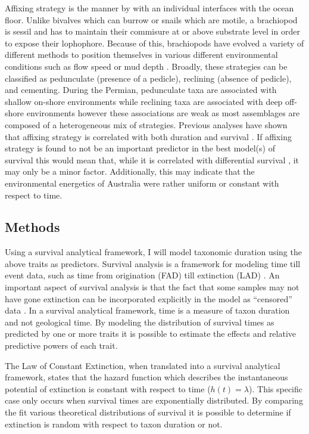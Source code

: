 \documentclass[12pt,letterpaper]{article}
\begin{document}
Affixing strategy is the manner by with an individual interfaces with the ocean floor. Unlike bivalves which can burrow or snails which are motile, a brachiopod is sessil and has to maintain their commisure at or above substrate level in order to expose their lophophore. Because of this, brachiopods have evolved a variety of different methods to position themselves in various different environmental conditions such as flow speed or mud depth \citep{Rudwick1970,Alexander1977,LaBarbera1978,LaBarbera1981,Richardson1997}. Broadly, these strategies can be classified as pedunculate (presence of a pedicle), reclining (absence of pedicle), and cementing. During the Permian, pedunculate taxa are associated with shallow on-shore environments while reclining taxa are associated with deep off-shore environments \citep{Clapham2007} however these associations are weak as most assemblages are composed of a heterogeneous mix of strategies. Previous analyses have shown that affixing strategy is correlated with both duration and survival \citep{Alexander1977,Johansen1989}. If affixing strategy is found to not be an important predictor in the best model(s) of survival this would mean that, while it is correlated with differential survival \citep{Alexander1977,Johansen1989}, it may only be a minor factor. Additionally, this may indicate that the environmental energetics of Australia were rather uniform or constant with respect to time.

\subsection{Methods}
Using a survival analytical framework, I will model taxonomic duration using the above traits as predictors. Survival analysis is a framework for modeling time till event data, such as time from origination (FAD) till extinction (LAD) \citep{Kleinbaum2005,Simpson1944,VanValen1973}. An important aspect of survival analysis is that the fact that some samples may not have gone extinction can be incorporated explicitly in the model as ``censored'' data \citep{Kleinbaum2005}. In a survival analytical framework, time is a measure of taxon duration and not geological time. By modeling the distribution of survival times as predicted by one or more traits it is possible to estimate the effects and relative predictive powers of each trait.

The Law of Constant Extinction, when translated into a survival analytical framework, states that the hazard function which describes the instantaneous potential of extinction is constant with respect to time (\(h(t) = \lambda\)). This specific case only occurs when survival times are exponentially distributed. By comparing the fit various theoretical distributions of survival it is possible to determine if extinction is random with respect to taxon duration or not. 
\end{document}
